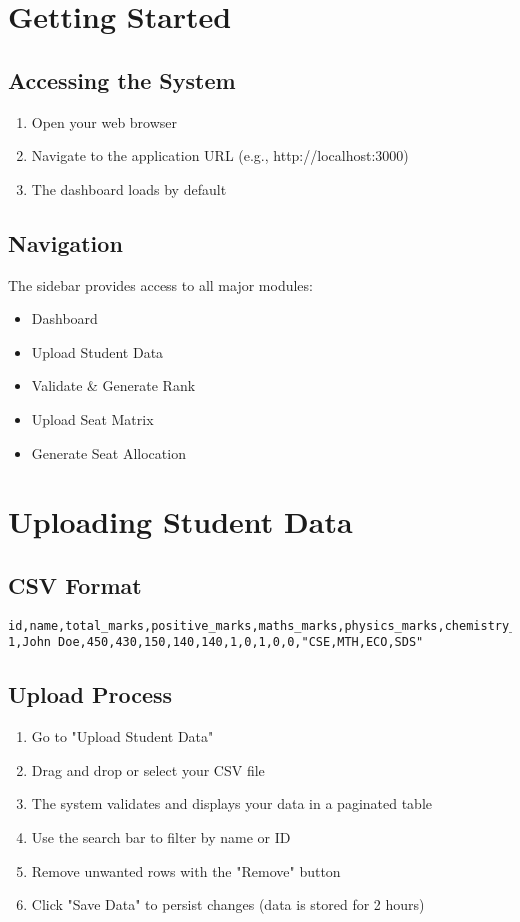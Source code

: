 \documentclass[12pt,a4paper]{article}
\begin{document}
\section{Getting Started}
\subsection{Accessing the System}
\begin{enumerate}
    \item Open your web browser
    \item Navigate to the application URL (e.g., http://localhost:3000)
    \item The dashboard loads by default
\end{enumerate}

\subsection{Navigation}
The sidebar provides access to all major modules:
\begin{itemize}
    \item Dashboard
    \item Upload Student Data
    \item Validate \& Generate Rank
    \item Upload Seat Matrix
    \item Generate Seat Allocation
\end{itemize}

\section{Uploading Student Data}
\subsection{CSV Format}
\begin{lstlisting}
id,name,total_marks,positive_marks,maths_marks,physics_marks,chemistry_marks,imotc,ioitc,inpho,incho,inbo,preference_order
1,John Doe,450,430,150,140,140,1,0,1,0,0,"CSE,MTH,ECO,SDS"
\end{lstlisting}

\subsection{Upload Process}
\begin{enumerate}
    \item Go to "Upload Student Data"
    \item Drag and drop or select your CSV file
    \item The system validates and displays your data in a paginated table
    \item Use the search bar to filter by name or ID
    \item Remove unwanted rows with the "Remove" button
    \item Click "Save Data" to persist changes (data is stored for 2 hours)
\end{enumerate}
\end{document}
